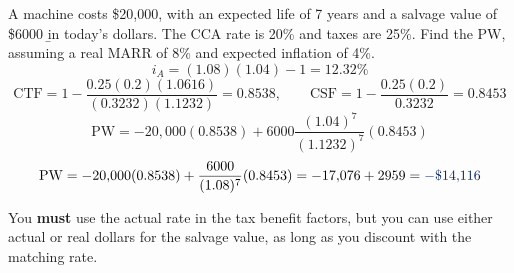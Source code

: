 \begin{example}
    A machine costs \$20,000, with an expected life of 7 years and a salvage
    value of \$6000 \b{in today's dollars}. The CCA rate is 20\% and taxes
    are 25\%. Find the PW, assuming a real MARR of 8\% and expected
    inflation of 4\%.
    \\
    \[i_A = (1.08)(1.04) - 1 = 12.32\%\]
    \[\text{CTF} = 1 - \frac{0.25(0.2)(1.0616)}{(0.3232)(1.1232)} = 0.8538, \qquad \text{CSF} = 1 - \frac{0.25(0.2)}{0.3232} = 0.8453\]
    \[\text{PW} = -20{,}000(0.8538) + 6000\frac{(1.04)^7}{(1.1232)^7}(0.8453)\]
    \[\text{PW} = -20{,}000(0.8538) + \frac{6000}{(1.08)^7}(0.8453) = -17{,}076 + 2959 = \db{-\$14{,}116}\]
\end{example}

\begin{remark}
    You \textbf{must} use the actual rate in the tax benefit factors, but
    you can use either actual or real dollars for the salvage value, as
    long as you discount with the matching rate.
\end{remark}

